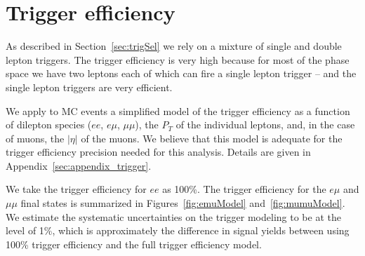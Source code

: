 \section{Trigger efficiency}
\label{sec:trgEff}

As described in Section~\ref{sec:trigSel} we rely on a
mixture of single and double lepton triggers.  The trigger
efficiency is very high because for most of the phase space 
we have two leptons each of which can fire a single lepton 
trigger -- and the single lepton triggers are very efficient.

We apply to MC events a simplified model of the trigger efficiency 
as a function of dilepton species ($ee$, $e\mu$, $\mu\mu$), the $P_T$ 
of the individual leptons, and, in the case of muons, the $|\eta|$
of the muons.  We believe that this model is adequate for
the trigger efficiency precision needed for this analysis.
Details are given in Appendix~\ref{sec:appendix_trigger}.

We take the trigger efficiency for $ee$ as 100\%.  The trigger efficiency
for the $e\mu$ and $\mu\mu$ final states is summarized in 
Figures~\ref{fig:emuModel} and~\ref{fig:mumuModel}.
We estimate the systematic uncertainties on the trigger modeling 
to be at the level of 1\%, which is approximately the difference in signal
yields between using 100\% trigger efficiency and the full trigger 
efficiency model.
